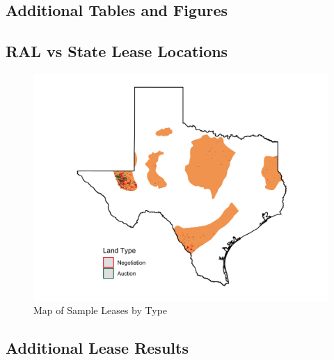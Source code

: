 \newpage

\begin{appendices}

\section{Additional Tables and Figures}

\setcounter{figure}{0}  \renewcommand{\thefigure}{A.\arabic{figure}} 
\setcounter{table}{0}  \renewcommand{\thetable}{A.\arabic{table}} 

\subsection{RAL vs State Lease Locations}
\begin{figure}[H]
\begin{centering}
\caption{Map of Sample Leases by Type \label{fig:RAL_map}}
\vspace{-10pt}
\includegraphics[width=1\textwidth]{../output/figures/glo_leases_in_texas.png}
\par\end{centering}
\end{figure}

\subsection{Additional Lease Results}\label{sec:extra_regressions}


\end{appendices}
